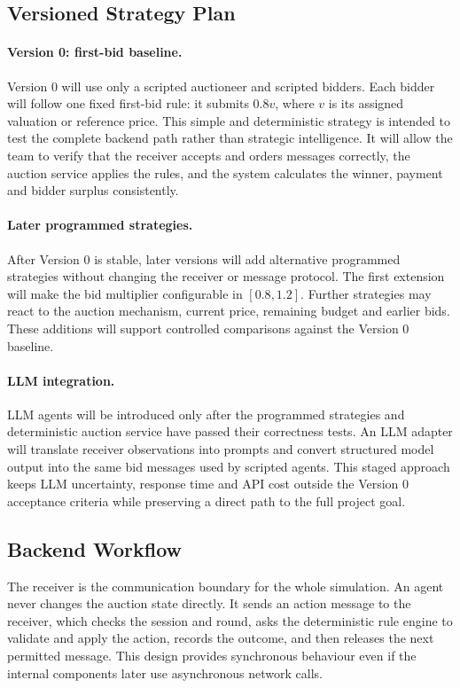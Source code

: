 \documentclass[11pt]{article}
\begin{document}
\subsection{Versioned Strategy Plan}
\paragraph{Version 0: first-bid baseline.} Version 0 will use only a scripted auctioneer and scripted bidders. Each bidder will follow one fixed first-bid rule: it submits $0.8v$, where $v$ is its assigned valuation or reference price. This simple and deterministic strategy is intended to test the complete backend path rather than strategic intelligence. It will allow the team to verify that the receiver accepts and orders messages correctly, the auction service applies the rules, and the system calculates the winner, payment and bidder surplus consistently.

\paragraph{Later programmed strategies.} After Version 0 is stable, later versions will add alternative programmed strategies without changing the receiver or message protocol. The first extension will make the bid multiplier configurable in $[0.8,1.2]$. Further strategies may react to the auction mechanism, current price, remaining budget and earlier bids. These additions will support controlled comparisons against the Version 0 baseline.

\paragraph{LLM integration.} LLM agents will be introduced only after the programmed strategies and deterministic auction service have passed their correctness tests. An LLM adapter will translate receiver observations into prompts and convert structured model output into the same bid messages used by scripted agents. This staged approach keeps LLM uncertainty, response time and API cost outside the Version 0 acceptance criteria while preserving a direct path to the full project goal.

\subsection{Backend Workflow}
The receiver is the communication boundary for the whole simulation. An agent never changes the auction state directly. It sends an action message to the receiver, which checks the session and round, asks the deterministic rule engine to validate and apply the action, records the outcome, and then releases the next permitted message. This design provides synchronous behaviour even if the internal components later use asynchronous network calls.
\end{document}
